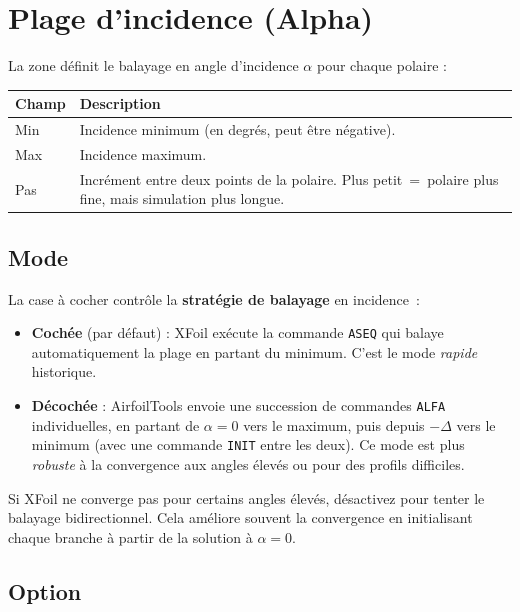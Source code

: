 \section{Plage d'incidence (Alpha)}

La zone  définit le balayage en angle d'incidence
$\alpha$ pour chaque polaire :

\begin{tabularx}{\linewidth}{l X}
    \toprule
    \textbf{Champ} & \textbf{Description} \\
    \midrule
    Min  & Incidence minimum (en degrés, peut être négative). \\
    Max  & Incidence maximum. \\
    Pas  & Incrément entre deux points de la polaire. Plus
           petit~=~polaire plus fine, mais simulation plus longue.\\
    \bottomrule
\end{tabularx}

\subsection*{Mode }

La case à cocher  contrôle la \textbf{stratégie de
balayage} en incidence~:

\begin{itemize}
    \item \textbf{Cochée} (par défaut) : XFoil exécute la commande
        \texttt{ASEQ} qui balaye automatiquement la plage en
        partant du minimum. C'est le mode \emph{rapide} historique.
    \item \textbf{Décochée} : AirfoilTools envoie une succession de
        commandes \texttt{ALFA} individuelles, en partant de
        $\alpha=0$ vers le maximum, puis depuis $-\Delta$ vers le
        minimum (avec une commande \texttt{INIT} entre les deux).
        Ce mode est plus \emph{robuste} à la convergence aux
        angles élevés ou pour des profils difficiles.
\end{itemize}

\begin{astuce}
Si XFoil ne converge pas pour certains angles élevés, désactivez
 pour tenter le balayage bidirectionnel. Cela
améliore souvent la convergence en initialisant chaque branche
à partir de la solution à $\alpha=0$.
\end{astuce}

\subsection*{Option }


